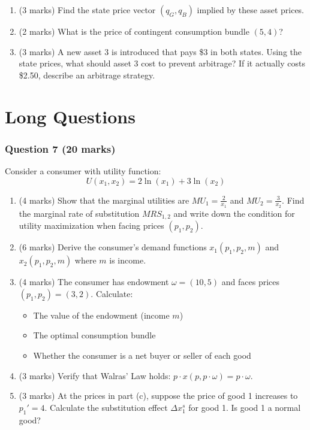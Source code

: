 \documentclass[12pt]{article}
\begin{document}
\begin{enumerate}[label=(\alph*)]
\item (3 marks) Find the state price vector $(q_G, q_B)$ implied by these asset prices.
\item (2 marks) What is the price of contingent consumption bundle $(5, 4)$?
\item (3 marks) A new asset 3 is introduced that pays \$3 in both states. Using the state prices, what should asset 3 cost to prevent arbitrage? If it actually costs \$2.50, describe an arbitrage strategy.
\end{enumerate}


\newpage
\part{Long Questions}

\section*{Question 7 (20 marks)}

Consider a consumer with utility function:
\[
U(x_1, x_2) = 2\ln(x_1) + 3\ln(x_2)
\]

\begin{enumerate}[label=(\alph*)]
\item (4 marks) Show that the marginal utilities are $MU_1 = \frac{2}{x_1}$ and $MU_2 = \frac{3}{x_2}$. Find the marginal rate of substitution $MRS_{1,2}$ and write down the condition for utility maximization when facing prices $(p_1, p_2)$.

\item (6 marks) Derive the consumer's demand functions $x_1(p_1, p_2, m)$ and $x_2(p_1, p_2, m)$ where $m$ is income.

\item (4 marks) The consumer has endowment $\omega = (10, 5)$ and faces prices $(p_1, p_2) = (3, 2)$. Calculate:
\begin{itemize}
\item The value of the endowment (income $m$)
\item The optimal consumption bundle
\item Whether the consumer is a net buyer or seller of each good
\end{itemize}

\item (3 marks) Verify that Walras' Law holds: $p \cdot x(p, p \cdot \omega) = p \cdot \omega$.

\item (3 marks) At the prices in part (c), suppose the price of good 1 increases to $p_1' = 4$. Calculate the substitution effect $\Delta x_1^s$ for good 1. Is good 1 a normal good?
\end{enumerate}
\end{document}
